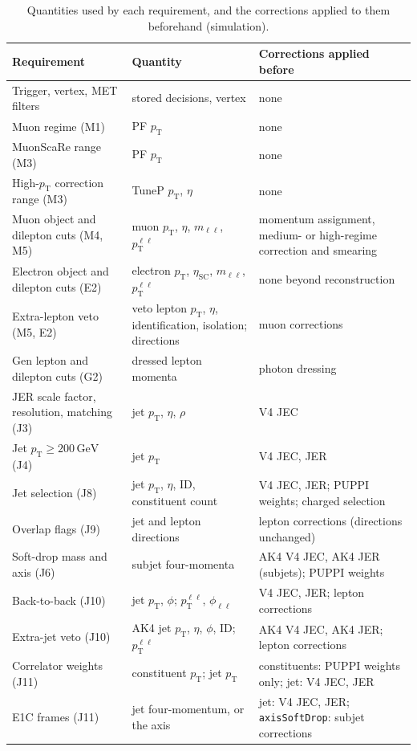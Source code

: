 \documentclass[11pt]{article}
\newcommand{\pt}{p_{\mathrm{T}}}
\newcommand{\GeV}{\ensuremath{\,\mathrm{GeV}}}
\newcommand{\ptll}{\pt^{\ell\ell}}
\newcommand{\code}[1]{\texttt{#1}}
\begin{document}
\begin{table}[htbp]
\centering
\caption{Quantities used by each requirement, and the corrections applied to them beforehand (simulation).}
\label{tab:order}
\small
\begin{tabularx}{\textwidth}{>{\raggedright\arraybackslash}p{4.3cm}>{\raggedright\arraybackslash}p{3.6cm}>{\raggedright\arraybackslash}X}
\toprule
Requirement & Quantity & Corrections applied before \\
\midrule
Trigger, vertex, MET filters & stored decisions, vertex & none \\
Muon regime (M1) & PF $\pt$ & none \\
MuonScaRe range (M3) & PF $\pt$ & none \\
High-$\pt$ correction range (M3) & TuneP $\pt$, $\eta$ & none \\
Muon object and dilepton cuts (M4, M5) & muon $\pt$, $\eta$, $m_{\ell\ell}$, $\ptll$ & momentum assignment, medium- or
  high-regime correction and smearing \\
Electron object and dilepton cuts (E2) & electron $\pt$, $\eta_\mathrm{SC}$, $m_{\ell\ell}$, $\ptll$ & none beyond
  reconstruction \\
Extra-lepton veto (M5, E2) & veto lepton $\pt$, $\eta$, identification, isolation; directions & muon corrections \\
Gen lepton and dilepton cuts (G2) & dressed lepton momenta & photon dressing \\
JER scale factor, resolution, matching (J3) & jet $\pt$, $\eta$, $\rho$ & V4 JEC \\
Jet $\pt \geq 200\GeV$ (J4) & jet $\pt$ & V4 JEC, JER \\
Jet selection (J8) & jet $\pt$, $\eta$, ID, constituent count & V4 JEC, JER; PUPPI weights; charged selection \\
Overlap flags (J9) & jet and lepton directions & lepton corrections (directions unchanged) \\
Soft-drop mass and axis (J6) & subjet four-momenta & AK4 V4 JEC, AK4 JER (subjets); PUPPI weights \\
Back-to-back (J10) & jet $\pt$, $\phi$; $\ptll$, $\phi_{\ell\ell}$ & V4 JEC, JER; lepton corrections \\
Extra-jet veto (J10) & AK4 jet $\pt$, $\eta$, $\phi$, ID; $\ptll$ & AK4 V4 JEC, AK4 JER; lepton corrections \\
Correlator weights (J11) & constituent $\pt$; jet $\pt$ & constituents: PUPPI weights only; jet: V4 JEC, JER \\
E1C frames (J11) & jet four-momentum, or the axis & jet: V4 JEC, JER; \code{axisSoftDrop}: subjet corrections \\
\bottomrule
\end{tabularx}
\end{table}
\end{document}
